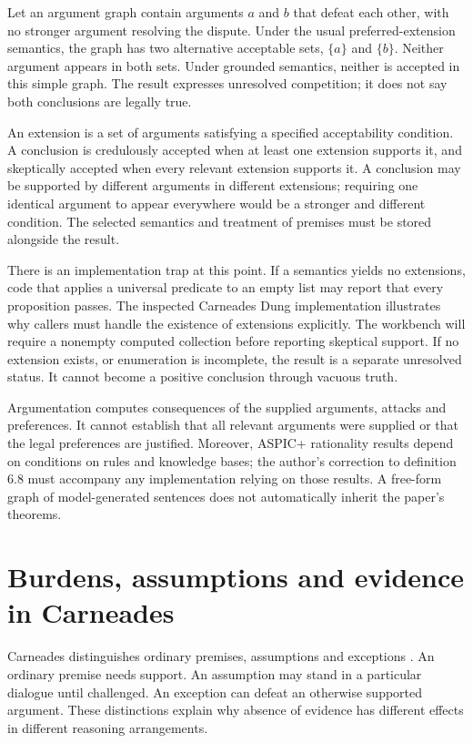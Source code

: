 Let an argument graph contain arguments $a$ and $b$ that defeat each other, with
no stronger argument resolving the dispute. Under the usual preferred-extension
semantics, the graph has two alternative acceptable sets, $\{a\}$ and $\{b\}$.
Neither argument appears in both sets. Under grounded semantics, neither is
accepted in this simple graph. The result expresses unresolved competition; it
does not say both conclusions are legally true.


An extension is a set of arguments satisfying a specified acceptability
condition. A conclusion is credulously accepted when at least one extension
supports it, and skeptically accepted when every relevant extension supports it.
A conclusion may be supported by different arguments in different extensions;
requiring one identical argument to appear everywhere would be a stronger and
different condition. The selected semantics and treatment of premises must be
stored alongside the result.

There is an implementation trap at this point. If a semantics yields no
extensions, code that applies a universal predicate to an empty list may report
that every proposition passes. The inspected Carneades Dung implementation
illustrates why callers must handle the existence of extensions explicitly. The
workbench will require a nonempty computed collection before reporting skeptical
support. If no extension exists, or enumeration is incomplete, the result is a
separate unresolved status. It cannot become a positive conclusion through
vacuous truth.

Argumentation computes consequences of the supplied arguments, attacks and
preferences. It cannot establish that all relevant arguments were supplied or
that the legal preferences are justified. Moreover, ASPIC+ rationality results
depend on conditions on rules and knowledge bases; the author's correction to
definition 6.8 must accompany any implementation relying on those results. A
free-form graph of model-generated sentences does not automatically inherit the
paper's theorems.

\section{Burdens, assumptions and evidence in Carneades}
\label{merge:M05:05}


Carneades distinguishes ordinary premises, assumptions and exceptions
\citep[sections 3--6]{carneades2007}. An ordinary premise needs support. An
assumption may stand in a particular dialogue until challenged. An exception can
defeat an otherwise supported argument. These distinctions explain why absence
of evidence has different effects in different reasoning arrangements.

